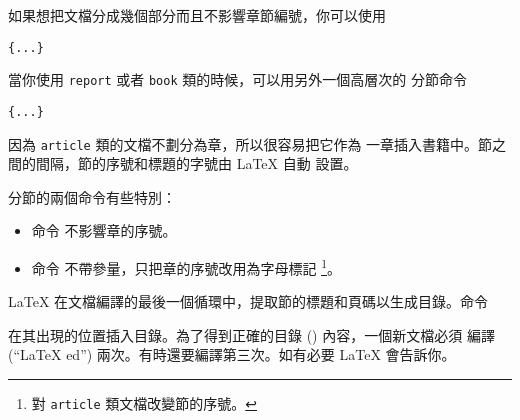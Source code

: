 如果想把文檔分成幾個部分而且不影響章節編號，你可以使用
\begin{lscommand}
\verb|{...}|
\end{lscommand}

當你使用 \texttt{report} 或者 \texttt{book} 類的時候，可以用另外一個高層次的
分節命令
\begin{lscommand}
\verb|{...}|
\end{lscommand}

因為 \texttt{article} 類的文檔不劃分為章，所以很容易把它作為
一章插入書籍中。節之間的間隔，節的序號和標題的字號由 \LaTeX{} 自動
設置。

分節的兩個命令有些特別：
\begin{itemize}
\item 命令  不影響章的序號。
\item 命令  不帶參量，只把章的序號改用為字母標記
\footnote{對 \texttt{article} 類文檔改變節的序號。}。
\end{itemize}


\LaTeX{} 在文檔編譯的最後一個循環中，提取節的標題和頁碼以生成目錄。命令
\begin{lscommand}
\end{lscommand}
\noindent 在其出現的位置插入目錄。為了得到正確的目錄 () 內容，一個新文檔必須 編譯 (``\LaTeX
ed'') 兩次。有時還要編譯第三次。如有必要 \LaTeX{} 會告訴你。

